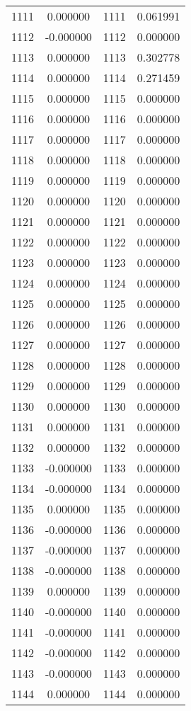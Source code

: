 \documentclass[12pt]{article}
\begin{document}
\begin{longtable}{@{}cccc@{}}
1111 & 0.000000 & 1111 & 0.061991 \\
1112 & -0.000000 & 1112 & 0.000000 \\
1113 & 0.000000 & 1113 & 0.302778 \\
1114 & 0.000000 & 1114 & 0.271459 \\
1115 & 0.000000 & 1115 & 0.000000 \\
1116 & 0.000000 & 1116 & 0.000000 \\
1117 & 0.000000 & 1117 & 0.000000 \\
1118 & 0.000000 & 1118 & 0.000000 \\
1119 & 0.000000 & 1119 & 0.000000 \\
1120 & 0.000000 & 1120 & 0.000000 \\
1121 & 0.000000 & 1121 & 0.000000 \\
1122 & 0.000000 & 1122 & 0.000000 \\
1123 & 0.000000 & 1123 & 0.000000 \\
1124 & 0.000000 & 1124 & 0.000000 \\
1125 & 0.000000 & 1125 & 0.000000 \\
1126 & 0.000000 & 1126 & 0.000000 \\
1127 & 0.000000 & 1127 & 0.000000 \\
1128 & 0.000000 & 1128 & 0.000000 \\
1129 & 0.000000 & 1129 & 0.000000 \\
1130 & 0.000000 & 1130 & 0.000000 \\
1131 & 0.000000 & 1131 & 0.000000 \\
1132 & 0.000000 & 1132 & 0.000000 \\
1133 & -0.000000 & 1133 & 0.000000 \\
1134 & -0.000000 & 1134 & 0.000000 \\
1135 & 0.000000 & 1135 & 0.000000 \\
1136 & -0.000000 & 1136 & 0.000000 \\
1137 & -0.000000 & 1137 & 0.000000 \\
1138 & -0.000000 & 1138 & 0.000000 \\
1139 & 0.000000 & 1139 & 0.000000 \\
1140 & -0.000000 & 1140 & 0.000000 \\
1141 & -0.000000 & 1141 & 0.000000 \\
1142 & -0.000000 & 1142 & 0.000000 \\
1143 & -0.000000 & 1143 & 0.000000 \\
1144 & 0.000000 & 1144 & 0.000000 \\

\end{longtable}
\end{document}
